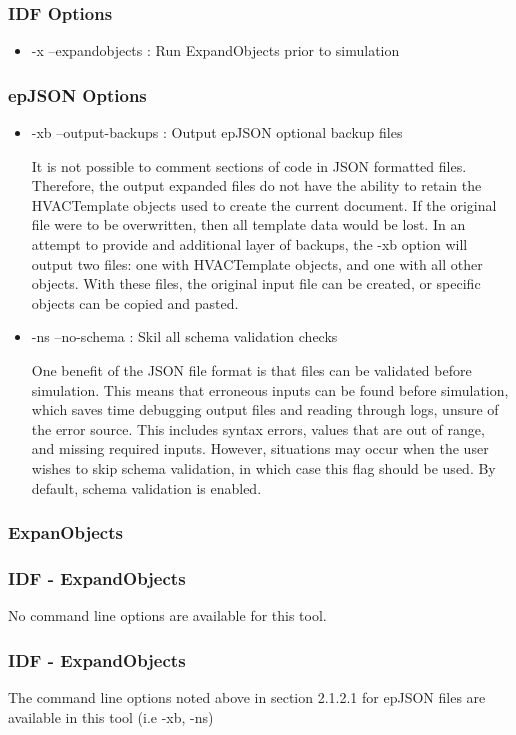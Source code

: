 \subsubsection*{IDF Options}

\begin{itemize}
\item
  -x --expandobjects : Run ExpandObjects prior to simulation
\end{itemize}

\subsubsection*{epJSON Options}

\begin{itemize}
\item
  -xb --output-backups : Output epJSON optional backup files
  
  It is not possible to comment sections of code in JSON formatted files.  Therefore, the output expanded files do not have the ability to retain the HVACTemplate objects used to create the current document.  If the original file were to be overwritten, then all template data would be lost.  In an attempt to provide and additional layer of backups, the -xb option will output two files: one with HVACTemplate objects, and one with all other objects.  With these files, the original input file can be created, or specific objects can be copied and pasted.
\item
  -ns --no-schema : Skil all schema validation checks
  
  One benefit of the JSON file format is that files can be validated before simulation.  This means that erroneous inputs can be found before simulation, which saves time debugging output files and reading through logs, unsure of the error source.  This includes syntax errors, values that are out of range, and missing required inputs.  However, situations may occur when the user wishes to skip schema validation, in which case this flag should be used.  By default, schema validation is enabled.

\end{itemize}

\subsubsection{ExpanObjects}

\subsubsection*{IDF - ExpandObjects}

No command line options are available for this tool.

\subsubsection*{IDF - ExpandObjects}

The command line options noted above in section 2.1.2.1 for epJSON files are available in this tool (i.e -xb, -ns)
